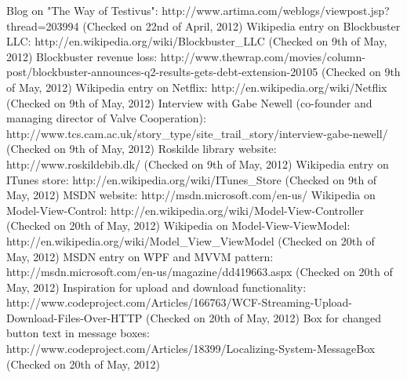 \begin{thebibliography}{9}
\label{Biblio}
 Blog on "The Way of Testivus": http://www.artima.com/weblogs/viewpost.jsp?thread=203994 (Checked on 22nd of April, 2012)
 Wikipedia entry on Blockbuster LLC: http://en.wikipedia.org/wiki/Blockbuster\_LLC (Checked on 9th of May, 2012)
 Blockbuster revenue loss:  http://www.thewrap.com/movies/column-post/blockbuster-announces-q2-results-gets-debt-extension-20105 (Checked on 9th of May, 2012)
 Wikipedia entry on Netflix: http://en.wikipedia.org/wiki/Netflix (Checked on 9th of May, 2012)
 Interview with Gabe Newell (co-founder and managing director of Valve Cooperation): http://www.tcs.cam.ac.uk/story\_type/site\_trail\_story/interview-gabe-newell/ (Checked on 9th of May, 2012)
 Roskilde library website: http://www.roskildebib.dk/ (Checked on 9th of May, 2012)
 Wikipedia entry on ITunes store: http://en.wikipedia.org/wiki/ITunes\_Store (Checked on 9th of May, 2012)
 MSDN website: http://msdn.microsoft.com/en-us/ 
 Wikipedia on Model-View-Control: http://en.wikipedia.org/wiki/Model-View-Controller (Checked on 20th of May, 2012)
 Wikipedia on Model-View-ViewModel: http://en.wikipedia.org/wiki/Model\_View\_ViewModel (Checked on 20th of May, 2012)
 MSDN entry on WPF and MVVM pattern: http://msdn.microsoft.com/en-us/magazine/dd419663.aspx (Checked on 20th of May, 2012)
 Inspiration for upload and download functionality:  http://www.codeproject.com/Articles/166763/WCF-Streaming-Upload-Download-Files-Over-HTTP (Checked on 20th of May, 2012)
 Box for changed button text in message boxes: http://www.codeproject.com/Articles/18399/Localizing-System-MessageBox (Checked on 20th of May, 2012)
\end{thebibliography}
